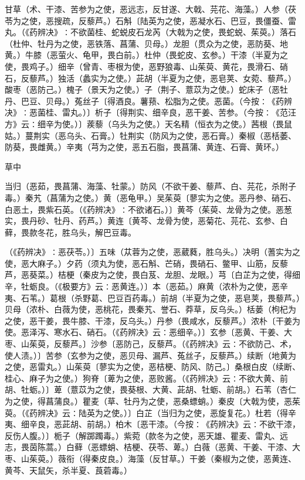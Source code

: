 \documentclass[a4paper,12pt,UTF8,twoside]{ctexbook}
\begin{document}
甘草（术、干漆、苦参为之使，恶远志，反甘遂、大戟、芫花、海藻。）人参（茯苓为之使，恶搜疏，反藜芦。）石斛〔陆英为之使，恶凝水石、巴豆，畏僵蚕、雷丸。（《药辨决》∶不欲菌桂、蛇蜕皮石龙芮（大戟为之使，畏蛇蜕、茱萸。）落石（杜仲、牡丹为之使，恶铁落、菖蒲、贝母。）龙胆（贯众为之使，恶防葵、地黄。）牛膝（恶萤火、龟甲，畏白前。）杜仲（畏蛇皮、玄参。）干漆（半夏为之使，畏鸡子。）细辛（曾青、枣根为使，恶野狼毒、山茱萸、黄花，畏滑石、硝石，反藜芦。）独活（蠡实为之使。）茈胡（半夏为之使，恶皂荚、女菀、藜芦。）酸枣（恶防己。）槐子（景天为之使。）子（荆子、薏苡为之使。）蛇床子（恶牡丹、巴豆、贝母。）菟丝子〔得酒良。薯蓣、松脂为之使。恶菌。（今按∶《药辨决》∶恶菌桂、雷丸。）〕析子〔得荆实、细辛良，恶干姜、苦参。（今按∶《范汪方》云∶细辛为使。）〕蒺藜（乌头为之使。）天名精（恒衣为之使。）茜根（畏鼠姑。）蔓荆实（恶乌头、石膏。）牡荆实（防风为之使，恶石膏。）秦椒（恶栝萎、防葵，畏雌黄。）辛夷（芎为之使，恶五石脂，畏菖蒲、黄连、石膏、黄环。）

草中

当归（恶茹，畏菖蒲、海藻、牡蒙。）防风（不欲干姜、藜芦、白、芫花，杀附子毒。）秦艽（菖蒲为之使。）黄（恶龟甲。）吴茱萸〔蓼实为之使。恶丹参、硝石、白恶土，畏紫石英。（《药辨决》∶不欲诸石。）〕黄芩（茱萸、龙骨为之使。恶葱实，畏丹砂、牡丹、药芦。）黄连〔黄芩、龙骨为使，恶菊花、芫花、玄参、白藓，畏款冬花，胜乌头，解巴豆毒。

（《药辨决》∶恶茯苓。）〕五味（苁蓉为之使，恶葳蕤，胜乌头。）决明（蓍实为之使，恶大麻子。）夕药（须丸为使，恶石斛、芒硝，畏硝石、鳖甲、山筋，反藜芦，恶葵菜。）桔梗（秦皮为之使，畏白芨、龙胆、龙眼。）芎〔白芷为之使，得细辛，牡蛎良。（《极要方》云∶恶黄连。）〕本（恶茹。）麻黄（浓朴为之使，恶辛夷、石苇。）葛根（杀野葛、巴豆百药毒。）前胡（半夏为之使，恶皂荚，畏藜芦。）贝母（浓朴、白薇为使，恶桃花，畏秦艽、誉石、莽草，反乌头。）栝蒌（枸杞为之使，恶干姜，畏牛膝、干漆，反乌头。）丹参（畏咸水，反藜芦。）浓朴〔干姜为使。恶泽泻、寒水石、硝石。（《药辨决》云∶恶细辛。）〕玄参〔恶黄、干姜、大枣、山茱萸，反藜芦。〕沙参〔恶防己，反藜芦。（《药辨决》云∶不欲防己、术，使人渍。）〕苦参（玄参为之使，恶贝母、漏芦、菟丝子，反藜芦。）续断（地黄为之使，恶雷丸。）山茱萸〔蓼实为之使，恶桔梗、防风、防己。〕桑根白皮（续断、桂心、麻子为之使。）狗脊〔萆为之使，恶败酱。（《药辨决》云∶不欲大黄、前胡、牡蛎。）〕萆（薏苡为之使，畏葵根、大黄、茈胡、牡蛎、前胡。）石苇（杏仁为之使，得菖蒲良。）瞿麦（草、牡丹为之使，恶桑螵蛸。）秦皮〔大戟为使，恶茱萸。（《药辨决》云∶陆英为之使。）〕白芷（当归为之使，恶旋复花。）杜若（得辛夷、细辛良，恶茈胡、前胡。）柏木〔恶干漆。（今按∶《药辨决》云∶不欲干漆，反伤人腹。）〕栀子（解踯躅毒。）紫菀（款冬为之使，恶天雄、瞿麦、雷丸、远志，畏茵陈蒿。）白藓（恶螵蛸、桔梗、茯苓、萆。）白薇（恶黄、干姜、干漆、大枣、山茱萸。）薇衔（得秦皮良。）海藻（反甘草。）干姜（秦椒为之使，恶黄连、黄芩、天鼠矢，杀半夏、莨菪毒。）
\end{document}
